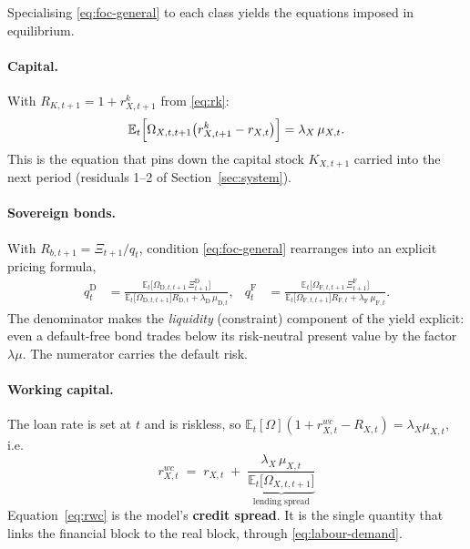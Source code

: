 \documentclass[11pt]{article}
\numberwithin{equation}{section}
\newcommand{\E}{\mathbb{E}}
\newcommand{\D}{\mathrm{D}}
\newcommand{\F}{\mathrm{F}}
\theoremstyle{definition}
\theoremstyle{plain}
\theoremstyle{remark}
\begin{document}
Specialising \eqref{eq:foc-general} to each class yields the equations imposed
in equilibrium.

\paragraph{Capital.} With $R_{K,t+1}=1+r^{k}_{X,t+1}$ from \eqref{eq:rk}:
\begin{equation}
\E_t\Bigl[\Omega_{X,t,t+1}\bigl(r^{k}_{X,t+1}-r_{X,t}\bigr)\Bigr]
=\lambda_X\,\mu_{X,t}.
\label{eq:capital-euler}
\end{equation}
This is the equation that pins down the capital stock $K_{X,t+1}$ carried into the
next period (residuals 1--2 of Section~\ref{sec:system}).

\paragraph{Sovereign bonds.} With $R_{b,t+1}=\Xi_{t+1}/q_t$, condition
\eqref{eq:foc-general} rearranges into an explicit pricing formula,
\begin{align}
q^{\D}_{t}&=\frac{\E_t\bigl[\Omega_{\D,t,t+1}\,\Xi^{\D}_{t+1}\bigr]}
                 {\E_t\bigl[\Omega_{\D,t,t+1}\bigr]R_{\D,t}+\lambda_\D\,\mu_{\D,t}},
&
q^{\F}_{t}&=\frac{\E_t\bigl[\Omega_{\F,t,t+1}\,\Xi^{\F}_{t+1}\bigr]}
                 {\E_t\bigl[\Omega_{\F,t,t+1}\bigr]R_{\F,t}+\lambda_\F\,\mu_{\F,t}} .
\label{eq:bond-pricing}
\end{align}
The denominator makes the \emph{liquidity} (constraint) component of the yield
explicit: even a default-free bond trades below its risk-neutral present value by the
factor $\lambda\mu$. The numerator carries the default risk.

\paragraph{Working capital.} The loan rate is set at $t$ and is riskless, so
$\E_t[\Omega](1+r^{wc}_{X,t}-R_{X,t})=\lambda_X\mu_{X,t}$, i.e.
\begin{equation}
\boxed{\;
r^{wc}_{X,t}\;=\;r_{X,t}\;+\;\underbrace{\frac{\lambda_X\,\mu_{X,t}}
                                               {\E_t\bigl[\Omega_{X,t,t+1}\bigr]}}
                                        _{\text{lending spread}}\;}
\label{eq:rwc}
\end{equation}
Equation~\eqref{eq:rwc} is the model's \textbf{credit spread}. It is the single
quantity that links the financial block to the real block, through
\eqref{eq:labour-demand}.
\end{document}
